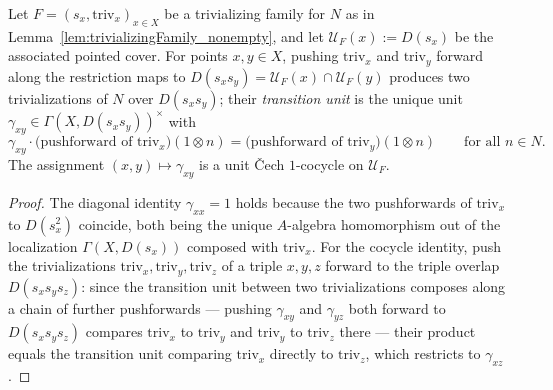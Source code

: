 \begin{definition}
  \label{def:trivializingFamily_cocycle}
  \leanok
  Let \(F = (s_x, \mathrm{triv}_x)_{x \in X}\) be a trivializing family for \(N\) as in
  Lemma~\ref{lem:trivializingFamily_nonempty}, and let \(\mathcal U_F(x) := D(s_x)\) be the
  associated pointed cover. For points \(x,y \in X\), pushing \(\mathrm{triv}_x\) and
  \(\mathrm{triv}_y\) forward along the restriction maps to \(D(s_xs_y) = \mathcal U_F(x) \cap
  \mathcal U_F(y)\) produces two trivializations of \(N\) over \(D(s_xs_y)\); their
  \emph{transition unit} is the unique unit \(\gamma_{xy} \in \Gamma(X,D(s_xs_y))^{\times}\)
  with
  \[
    \gamma_{xy} \cdot \bigl(\text{pushforward of } \mathrm{triv}_x\bigr)(1 \otimes n) =
    \bigl(\text{pushforward of } \mathrm{triv}_y\bigr)(1 \otimes n) \qquad \text{for all } n \in
    N.
  \]
  The assignment \((x,y) \mapsto \gamma_{xy}\) is a unit \v Cech \(1\)-cocycle on
  \(\mathcal U_F\).
\end{definition}
\begin{proof}
  \leanok
  The diagonal identity \(\gamma_{xx} = 1\) holds because the two pushforwards of
  \(\mathrm{triv}_x\) to \(D(s_x^2)\) coincide, both being the unique \(A\)-algebra
  homomorphism out of the localization \(\Gamma(X,D(s_x))\) composed with \(\mathrm{triv}_x\).
  For the cocycle identity, push the trivializations \(\mathrm{triv}_x, \mathrm{triv}_y,
  \mathrm{triv}_z\) of a triple \(x,y,z\) forward to the triple overlap \(D(s_xs_ys_z)\): since
  the transition unit between two trivializations composes along a chain of further
  pushforwards --- pushing \(\gamma_{xy}\) and \(\gamma_{yz}\) both forward to
  \(D(s_xs_ys_z)\) compares \(\mathrm{triv}_x\) to \(\mathrm{triv}_y\) and \(\mathrm{triv}_y\)
  to \(\mathrm{triv}_z\) there --- their product equals the transition unit comparing
  \(\mathrm{triv}_x\) directly to \(\mathrm{triv}_z\), which restricts to \(\gamma_{xz}\).
\end{proof}

